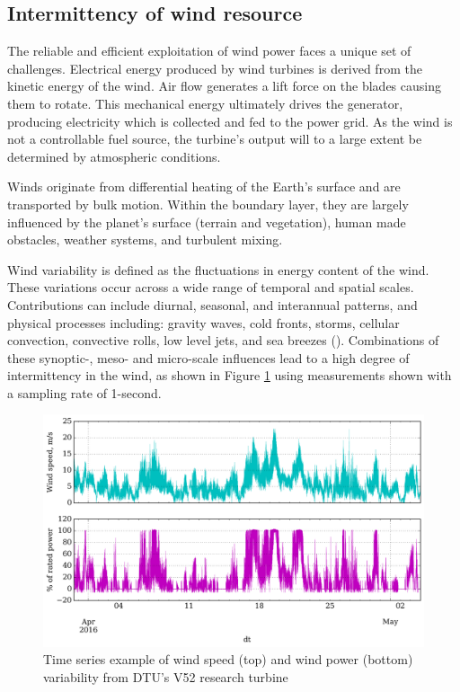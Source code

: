 \clearpage
\subsection{Intermittency of wind resource}
\label{sec:intro_intermittency}

The reliable and efficient exploitation of wind power faces a unique set of challenges. Electrical energy produced by wind turbines is derived from the kinetic energy of the wind. Air flow generates a lift force on the blades causing them to rotate. This mechanical energy ultimately drives the generator, producing electricity which is collected and fed to the power grid. As the wind is not a controllable fuel source, the turbine's output will to a large extent be determined by atmospheric conditions.

Winds originate from differential heating of the Earth's surface and are transported by bulk motion. Within the boundary layer, they are largely influenced by the planet's surface (terrain and vegetation), human made obstacles, weather systems, and turbulent mixing. 

Wind variability is defined as the fluctuations in energy content of the wind. These variations occur across a wide range of temporal and spatial scales. Contributions can include diurnal, seasonal, and interannual patterns, and physical processes including: gravity waves, cold fronts, storms, cellular convection, convective rolls, low level jets, and sea breezes (\cite{vincent_forecasting_2017}). Combinations of these synoptic-, meso- and micro-scale influences lead to a high degree of intermittency in the wind, as shown in Figure \ref{fig:wind_speed_power_ts} using measurements shown with a sampling rate of 1-second.

\begin{figure}[htbp]
    \centering
        \includegraphics[width=1.0\textwidth]{graphics/intro/variability/wind_speed_power_ts.png}
    \caption{Time series example of wind speed (top) and wind power (bottom) variability from DTU's V52 research turbine}
    \label{fig:wind_speed_power_ts}
\end{figure}


